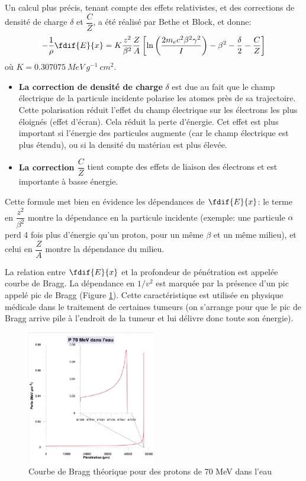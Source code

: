 Un calcul plus précis, tenant compte des effets relativistes, et des corrections de densité de charge $\delta$ et $\dfrac{C}{Z}$, a été réalisé par Bethe et Block, et donne:
\[
    -\dfrac{1}{\rho}\fdif{E}{x} = K\dfrac{z^2}{\beta^2}\dfrac{Z}{A} \left[\ln\left(\dfrac{2m_ec^2\beta^2\gamma^2}{I}\right) - \beta^2-\dfrac{\delta}{2} -\dfrac{C}{Z}\right]
\]
où $K=\SI{0.307075}{MeV~g^{-1}~cm^2}$.

\begin{itemize}[label=$\longrightarrow$]
    \item \textbf{La correction de densité de charge} $\delta$ est due au fait que le champ électrique de la particule incidente polarise les atomes près de sa trajectoire. Cette polarisation réduit l'effet du champ électrique sur les électrons les plus éloignés (effet d'écran). Cela réduit la perte d'énergie. Cet effet est plus important si l'énergie des particules augmente (car le champ électrique est plus étendu), ou si la densité du matériau est plus élevée.
    \item \textbf{La correction $\dfrac{C}{Z}$} tient compte des effets de liaison des électrons et est importante à basse énergie.
\end{itemize}

\begin{rem}
    Cette formule met bien en évidence les dépendances de $\fdif{E}{x}$: le terme en $\dfrac{z^2}{\beta^2}$ montre la dépendance en la particule incidente (exemple: une particule $\alpha$ perd 4 fois plus d'énergie qu'un proton, pour un même $\beta$ et un même milieu), et celui en $\dfrac{Z}{A}$ montre la dépendance du milieu.
\end{rem}
\begin{rem}
    La relation entre $\fdif{E}{x}$ et la profondeur de pénétration est appelée courbe de Bragg. La dépendance en $1/v^2$ est marquée par la présence d'un pic appelé pic de Bragg (Figure \ref{fig:pic_bragg}). Cette caractéristique est utilisée en physique médicale dans le traitement de certaines tumeurs (on s'arrange pour que le pic de Bragg arrive pile à l'endroit de la tumeur et lui délivre donc toute son énergie).
\end{rem}

\begin{figure}[H]
    \centering
    \includegraphics[width=0.5\textwidth]{Images1/picbragg.PNG}
    \caption{Courbe de Bragg théorique pour des protons de 70 \si{MeV} dans l'eau}
    \label{fig:pic_bragg}
\end{figure}

